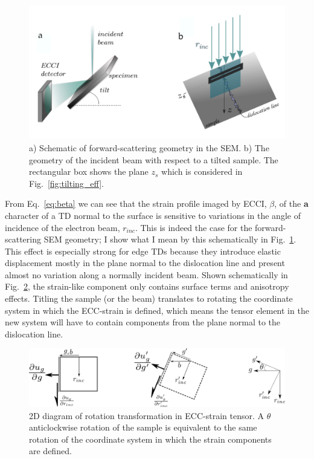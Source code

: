 \begin{figure}[ht]
    \centering
    \includegraphics[width=0.8\linewidth]{Figures/forward_geom.png}
    \caption[Forward-scattering geometry.]{a) Schematic of forward-scattering geometry in the SEM. b) The geometry of the incident beam with respect to a tilted sample. The rectangular box shows the plane $z_s$ which is considered in Fig.~\ref{fig:tilting_eff}.  }
    \label{fig:tilt}
\end{figure}

From Eq.~\ref{eq:beta} we can see that the strain profile imaged by ECCI, $\beta$,  of the \textbf{a} character of a TD normal to the surface is sensitive to variations in the angle of incidence of the electron beam, $r_{inc}$. This is indeed the case for the forward-scattering SEM geometry; I show what I mean by this schematically in Fig.~\ref{fig:tilt}. This effect is especially strong for edge TDs because they introduce elastic displacement mostly in the plane normal to the dislocation line and present almost no variation along a normally incident beam. Shown schematically in Fig.~\ref{fig:tilting}, the strain-like component only contains surface terms and anisotropy effects. Titling the sample (or the beam) translates to rotating the coordinate system in which the ECC-strain is defined, which means the tensor element in the new system will have to contain components from the plane normal to the dislocation line.

\begin{figure}[ht]
    \centering
    \includegraphics[width=0.9\linewidth]{Figures/tilting.png}
    \caption[Rotation transformation of sample tilting.]{2D diagram of rotation transformation in ECC-strain tensor. A $\theta$ anticlockwise rotation of the sample is equivalent to the same rotation of the coordinate system in which the strain components are defined. }
    \label{fig:tilting}
\end{figure}


